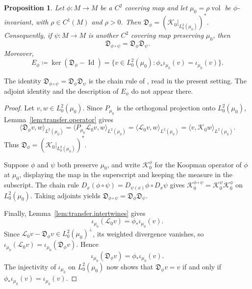 \documentclass[11pt,reqno]{amsart}
\theoremstyle{plain}
\newtheorem{prp}[thm]{Proposition}
\theoremstyle{definition}
\newcommand{\D}{\mathfrak{D}}
\newcommand{\Koop}{\mathcal{K}}
\newcommand{\Transf}{\mathcal{L}}
\DeclareMathOperator{\Id}{Id}
\DeclareMathOperator{\vol}{vol}
\begin{document}
\begin{prp}
\label{prp:derivative.functoriality}
    Let \( \phi:M\to M \) be a \( C^2 \) covering map and let \( \mu_0=\rho\vol \) be \( \phi \)-invariant, with \( \rho\in C^1(M) \) and \( \rho>0 \).
    Then \(\D_\phi=\left(\Koop_0|_{L^2_0(\mu_0)}\right)^\ast \).
    Consequently, if \( \psi:M\to M \) is another \( C^2 \) covering map preserving \( \mu_0 \), then
    \[
        \D_{\phi\circ\psi}=\D_\phi\D_\psi .
    \]
    Moreover,
    \[
        E_\phi \coloneqq \ker(\D_\phi-\Id)=\big\{v\in L^2_0(\mu_0):\phi_\ast\iota_{\mu_0}(v)=\iota_{\mu_0}(v)\big\}.
    \]
\end{prp}

The identity \( \D_{\phi\circ\psi}=\D_\phi\D_\psi \) is the chain rule of \cite[Corollary 3.13]{lessel_differentiable_2020}, read in the present setting. 
The adjoint identity and the description of \( E_\phi \) do not appear there.

\begin{proof}
    Let \( v,w\in L^2_0(\mu_0) \).
    Since \( P_{\mu_0} \) is the orthogonal projection onto \( L^2_0(\mu_0) \), Lemma~\ref{lem:transfer.operator} gives
    \[
        \big\langle\D_\phi v,w\big\rangle_{L^2(\mu_0)}
        =\big\langle P_{\mu_0}\Transf_0v,w\big\rangle_{L^2(\mu_0)}
        =\big\langle\Transf_0v,w\big\rangle_{L^2(\mu_0)}
        =\big\langle v,\Koop_0w\big\rangle_{L^2(\mu_0)} .
    \]
    Thus \( \D_\phi=\left(\Koop_0|_{L^2_0(\mu_0)}\right)^\ast \).

    Suppose \( \phi \) and \( \psi \) both preserve \( \mu_0 \), and write \( \Koop_0^\phi \) for the Koopman operator of \( \phi \) at \( \mu_0 \), displaying the map in the superscript and keeping the measure in the subscript.
    The chain rule \( D_x(\phi\circ\psi)=D_{\psi(x)}\phi\circ D_x\psi \) gives \( \Koop_0^{\phi\circ\psi}=\Koop_0^{\psi}\Koop_0^{\phi} \) on \( L^2_0(\mu_0) \).
    Taking adjoints yields \( \D_{\phi\circ\psi}=\D_\phi\D_\psi \).

    Finally, Lemma~\ref{lem:transfer.intertwines} gives
    \[
        \iota_{\mu_0}(\Transf_0v)=\phi_\ast\iota_{\mu_0}(v).
    \]
    Since \( \Transf_0v-\D_\phi v\in L^2_0(\mu_0)^\perp \), its weighted divergence vanishes, so \( \iota_{\mu_0}(\Transf_0v)=\iota_{\mu_0}(\D_\phi v) \).
    Hence
    \[
        \iota_{\mu_0}(\D_\phi v)=\phi_\ast\iota_{\mu_0}(v).
    \]
    The injectivity of \( \iota_{\mu_0} \) on \( L^2_0(\mu_0) \) now shows that \( \D_\phi v=v \) if and only if \( \phi_\ast\iota_{\mu_0}(v)=\iota_{\mu_0}(v) \).
\end{proof}
\end{document}
